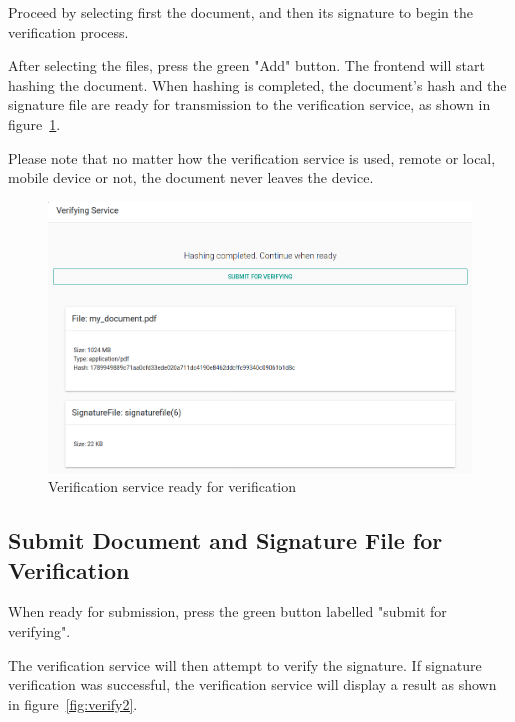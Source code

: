 Proceed by selecting first the document, and then its signature to begin the verification process.


After selecting the files, press the green "Add" button.
The frontend will start hashing the document.
When hashing is completed,
the document's hash and the signature file are ready for transmission to the verification service,
as shown in figure~\ref{fig:verify1}.


Please note that no matter how the verification service is used,
remote or local,
mobile device or not,
the document never leaves the device.

\begin{figure}[H]
    \begin{center}
        \includegraphics[width=\linewidth]{images/userguide_verify_1.png}
    \end{center}
    \caption{Verification service ready for verification}
    \label{fig:verify1}
\end{figure}

\subsection{Submit Document and Signature File for Verification}\label{subsec:submit-document-and-signature-file-for-verification}

When ready for submission, press the green button labelled "submit for verifying".

The verification service will then attempt to verify the signature.
If signature verification was successful,
the verification service will display a result as shown in figure~\ref{fig:verify2}.


